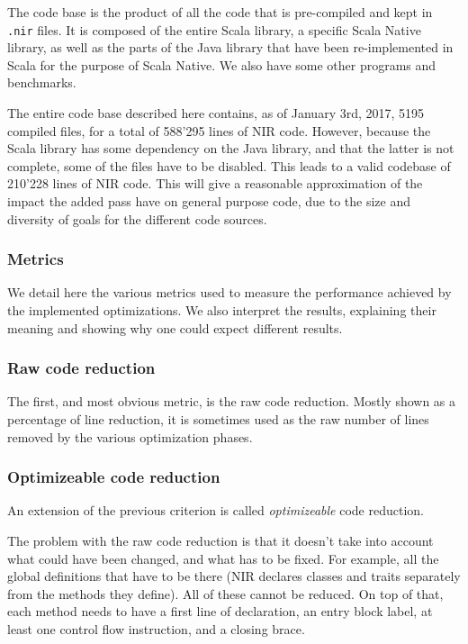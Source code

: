 \documentclass[12pt,a4paper]{article}
\begin{document}
The code base is the product of all the code that is pre-compiled and kept in \texttt{.nir} files. It is composed of the entire Scala library, a specific Scala Native library, as well as the parts of the Java library that have been re-implemented in Scala for the purpose of Scala Native. We also have some other programs and benchmarks.

The entire code base described here contains, as of January 3rd, 2017, 5195 compiled files, for a total of 588'295 lines of NIR code. However, because the Scala library has some dependency on the Java library, and that the latter is not complete, some of the files have to be disabled. This leads to a valid codebase of 210'228 lines of NIR code. This will give a reasonable approximation of the impact the added pass have on general purpose code, due to the size and diversity of goals for the different code sources.

\subsubsection{Metrics}

We detail here the various metrics used to measure the performance achieved by the implemented optimizations. We also interpret the results, explaining their meaning and showing why one could expect different results.

\subsubsection*{Raw code reduction}

The first, and most obvious metric, is the raw code reduction. Mostly shown as a percentage of line reduction, it is sometimes used as the raw number of lines removed by the various optimization phases.

\subsubsection*{Optimizeable code reduction}

An extension of the previous criterion is called \textit{optimizeable} code reduction.

The problem with the raw code reduction is that it doesn't take into account what could have been changed, and what has to be fixed. For example, all the global definitions that have to be there (NIR declares classes and traits separately from the methods they define). All of these cannot be reduced. On top of that, each method needs to have a first line of declaration, an entry block label, at least one control flow instruction, and a closing brace.
\end{document}
